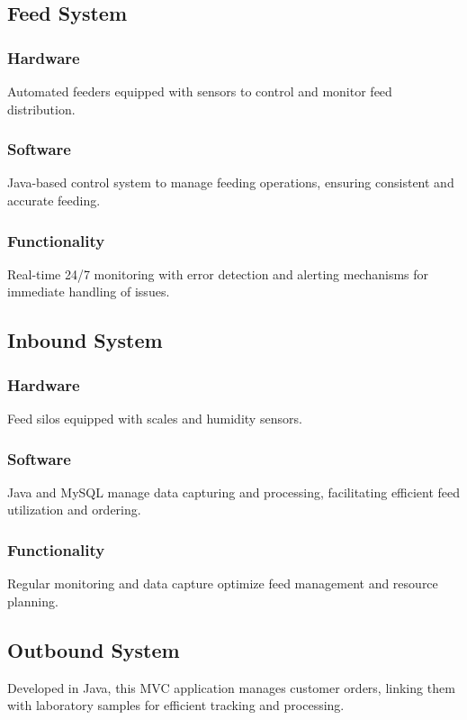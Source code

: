 \subsection{\textbf{Feed System}}
\subsubsection{Hardware}
Automated feeders equipped with sensors to control and monitor feed distribution.\vspace{2mm}
\subsubsection{Software}
Java-based control system to manage feeding operations, ensuring consistent and accurate feeding.\vspace{2mm}
\subsubsection{Functionality}
Real-time 24/7 monitoring with error detection and alerting mechanisms for immediate handling of issues.

\subsection{\textbf{Inbound System}}
\subsubsection{Hardware}
Feed silos equipped with scales and humidity sensors.\vspace{2mm}
\subsubsection{Software}
Java and MySQL manage data capturing and processing, facilitating efficient feed utilization and ordering.\vspace{2mm}
\subsubsection{Functionality}
Regular monitoring and data capture optimize feed management and resource planning.

\subsection{\textbf{Outbound System}}
Developed in Java, this MVC application manages customer orders, linking them with laboratory samples for efficient tracking and processing.

